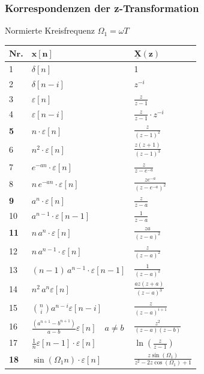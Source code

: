 \begin{multicols*}{2}
\subsubsection{Korrespondenzen der z-Transformation}
Normierte Kreisfrequenz $\Omega_1 = \omega T$\\
\renewcommand{\arraystretch}{1.7}
\begin{tabularx}{\columnwidth}{|l|X|X|}
	\hline $\mathbf{N r}$. & $\mathbf{x}[\mathbf{n}]$ & $\mathbf{\underline{X}}(\mathbf{z})$ \\
	\hline 1 & $\delta[n]$ & 1 \\
	\hline 2 & $\delta[n-i]$ & $z^{-i}$ \\
	\hline 3 & $\varepsilon[n]$ & $\frac{z}{z-1}$ \\
	\hline 4 & $\varepsilon[n-i]$ & $\frac{z}{z-1} \cdot z^{-i}$ \\
	\hline \textbf{5} & $n \cdot \varepsilon[n]$ & $\frac{z}{(z-1)^{2}}$ \\
	\hline 6 &  $n^2 \cdot \varepsilon[n]$ & $\frac{z(z+1)}{(z-1)^3}$  \\
\hline 7 & $e^{-a n} \cdot \varepsilon[n]$ & $\frac{z}{z-e^{-a}}$ \\
\hline 8 & $n \, e^{-a n} \cdot \varepsilon[n]$ & $\frac{z e^{-a}}{\left(z-e^{-a}\right)^{2}}$ \\
\hline \textbf{9} & $a^{n} \cdot \varepsilon[n]$ & $\frac{z}{z-a}$ \\
\hline 10 & $a^{n-1} \cdot \varepsilon[n-1]$ & $\frac{1}{z-a}$ \\
\hline \textbf{11} & $n\,a^{n} \cdot \varepsilon[n]$ & $\frac{z a}{(z-a)^{2}}$ \\
\hline 12 & $n \, a^{n-1} \cdot \varepsilon[n]$ & $\frac{z}{(z-a)^{2}}$ \\
\hline 13 & $(n-1) \, a^{n-1} \cdot \varepsilon[n-1]$ & $\frac{1}{(z-a)^{2}}$ \\
\hline 14 & $n^{2} \, a^{n} \varepsilon[n]$ & $\frac{a z(z+a)}{(z-a)^{3}}$ \\
\hline 15 & $\binom{n}{i} a^{n-i} \varepsilon[n-i]$ & $\frac{z}{(z-a)^{i+1}}$ \\
\hline 16 & $\frac{\left(a^{n+1}-b^{n+1}\right)}{a-b} \varepsilon[n] \quad a \neq b$ & $\frac{z^{2}}{(z-a)(z-b)}$ \\
\hline 17 & $\frac{1}{n} \varepsilon[n-1] \cdot \varepsilon[n]$ & $\ln \left(\frac{z}{z-1}\right)$ \\
\hline \textbf{18} & $\sin (\Omega_1 n ) \cdot \varepsilon[n]$ & $\frac{z \sin (\Omega_1)}{z^{2}-2 z \cos (\Omega_1)+1}$ \\

\end{tabularx}
\end{multicols*}
